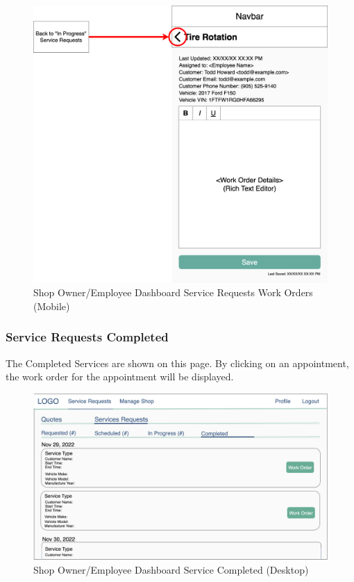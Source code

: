 \documentclass[12pt, titlepage]{article}
\begin{document}
\begin{figure}[H]
	\centering
	\includegraphics[width=\textwidth]{mockups/Shop Owner-Employee Work Order (Mobile).png}
	\caption{Shop Owner/Employee Dashboard \textemdash{} Service Requests \textemdash{} Work Orders (Mobile)}
\end{figure}

\subsubsection{Service Requests \textemdash{} Completed} The Completed Services are shown on this page. By clicking on an appointment, the work
order for the appointment will be displayed.

\begin{figure}[H]
	\centering
	\includegraphics[width=\textwidth]{mockups/Shop Owner Dashboard (Service Requests - Completed) (Desktop).png}
	\caption{Shop Owner/Employee Dashboard \textemdash{} Service \textemdash{} Completed (Desktop)}
\end{figure}
\end{document}
